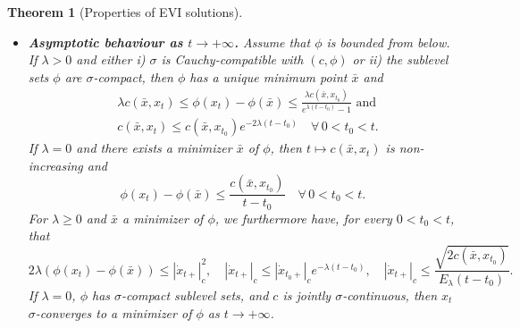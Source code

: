 \documentclass[reqno]{amsart}
\newcounter{results}[section]
\theoremstyle{plain}
\newtheorem{theorem}[results]{Theorem}
\theoremstyle{remark}
\theoremstyle{plain}
\numberwithin{equation}{section}
\theoremstyle{remark}
\newcommand{\x}{\bar x}
\begin{document}
\begin{theorem}[Properties of  EVI solutions]
\begin{itemize}[leftmargin=5mm]
    \item {\bf Asymptotic behaviour as $t\to +\infty$.} Assume that $\phi$ is bounded from below. If $\lambda>0$ and either {\it i)}
$\sigma$ is Cauchy-compatible with $(c,\phi)$ or {\it ii)} the sublevel sets $\phi$ are  $\sigma$-compact,  then $\phi$ has a unique minimum point $\x$ and
    \begin{align}
     &\lambda c(\x,x_t)\le \phi(x_t)-\phi(\x) \le \frac{\lambda c(\x,x_{t_0})}{e^{\lambda (t-t_0)}-1} \text{ and} \nonumber\\
    &c(\x,x_t)\le c(\x,x_{t_0})e^{- 2 \lambda(t-t_0)} \quad  \forall \, 0 < t_0  <  t. \label{eq:asympt_lambda}
    \end{align}
    If $\lambda=0$ and there exists a minimizer $\x$ of $\phi$, then $t \mapsto c(\x,x_t)$ is non-increasing and
    \begin{equation}
        \phi(x_t)-\phi(\x) \le \frac{c(\x,x_{t_0})}{t-t_0} \quad  \forall \, 0 < t_0 < t. \label{eq:asympt_lambda0}
    \end{equation}
   For $\lambda\ge0$  and $\x$ a minimizer of $\phi$, we  furthermore have,  for every $0<t_0 < t$, that
    \begin{equation}
    2\lambda(\phi(x_t)-\phi(\x)) \le |\dot x_{t+ }|_c^2, \quad |\dot x_{t+ }|_c \le |\dot x_{t_0+ }|_c e^{-\lambda(t-t_0)}, \quad  |\dot x_{t+ }|_c\le \frac{ \sqrt{2c(\x,x_{t_0})}}{E_\lambda(t-t_0)}.\label{eq:asympt_lambda_deriv}
    \end{equation}
     If $\lambda=0$, $\phi$ has  $\sigma$-compact sublevel sets,  and $c$ is  jointly  $\sigma$-continuous,  then $x_t$ $\sigma$-converges to a minimizer of $\phi$  as  $t\to +\infty$.
\end{itemize}


\end{theorem}
\end{document}
